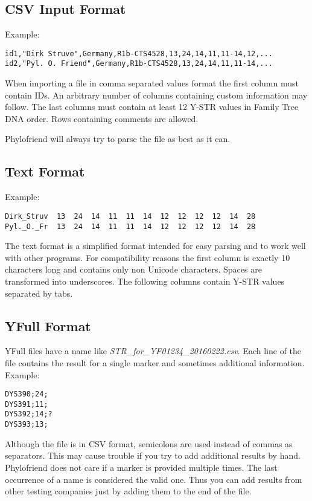 \subsection{CSV Input Format}

Example:

\begin{verbatim}
id1,"Dirk Struve",Germany,R1b-CTS4528,13,24,14,11,11-14,12,...
id2,"Pyl. O. Friend",Germany,R1b-CTS4528,13,24,14,11,11-14,...
\end{verbatim}

When importing a file in comma separated values format the
first column must contain IDs. An arbitrary number of columns
containing custom information may follow. The last columns
must contain at least 12 Y-STR values in Family Tree DNA order.
Rows containing comments are allowed.

Phylofriend will always try to parse the file as best as
it can.


\subsection{Text Format}

Example:

\begin{verbatim}
Dirk_Struv	13	24	14	11	11	14	12	12	12	12	14	28
Pyl._O._Fr	13	24	14	11	11	14	12	12	12	12	14	28
\end{verbatim}

The text format is a simplified format intended for easy
parsing and to work well with other programs. For compatibility
reasons the first column is exactly 10 characters long and
contains only non Unicode characters. Spaces are transformed into
underscores. The following columns contain Y-STR values
separated by tabs.


\subsection{YFull Format}

YFull files have a name like \emph{STR\_for\_YF01234\_20160222.csv}.
Each line of the file contains the result for a single marker and
sometimes additional information. Example:

\begin{verbatim}
DYS390;24;
DYS391;11;
DYS392;14;?
DYS393;13;
\end{verbatim}

Although the file is in CSV format, semicolons are used instead
of commas as separators. This may cause trouble if you try to
add additional results by hand. Phylofriend does not care if a
marker is provided multiple times. The last occurrence of a name
is considered the valid one. Thus you can add results from other
testing companies just by adding them to the end of the file.

